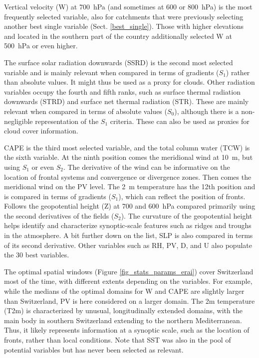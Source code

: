\documentclass[draft]{agujournal2019}
\begin{document}
Vertical velocity (W) at 700~hPa (and sometimes at 600 or 800~hPa) is the most frequently selected variable, also for catchments that were previously selecting another best single variable (Sect. \ref{best_single}). Those with higher elevations and located in the southern part of the country additionally selected W at 500~hPa or even higher.

The surface solar radiation downwards (SSRD) is the second most selected variable and is mainly relevant when compared in terms of gradients ($S_{1}$) rather than absolute values. It might thus be used as a proxy for clouds. Other radiation variables occupy the fourth and fifth ranks, such as surface thermal radiation downwards (STRD) and surface net thermal radiation (STR). These are mainly relevant when compared in terms of absolute values ($S_{0}$), although there is a non-negligible representation of the $S_{1}$ criteria. These can also be used as proxies for cloud cover information.

CAPE is the third most selected variable, and the total column water (TCW) is the sixth variable. At the ninth position comes the meridional wind at 10~m, but using $S_{1}$ or even $S_{2}$. The derivative of the wind can be informative on the location of frontal systems and convergence or divergence zones. Then comes the meridional wind on the PV level. The 2~m temperature has the 12th position and is compared in terms of gradients ($S_{1}$), which can reflect the position of fronts. Follows the geopotential height (Z) at 700 and 600~hPa compared primarily using the second derivatives of the fields ($S_{2}$). The curvature of the geopotential height helps identify and characterize synoptic-scale features such as ridges and troughs in the atmosphere. A bit further down on the list, SLP is also compared in terms of its second derivative. Other variables such as RH, PV, D, and U also populate the 30 best variables.

The optimal spatial windows (Figure \ref{fig_stats_params_erai}) cover Switzerland most of the time, with different extents depending on the variables. For example, while the medians of the optimal domains for W and CAPE are slightly larger than Switzerland, PV is here considered on a larger domain. The 2m temperature (T2m) is characterized by unusual, longitudinally extended domains, with the main body in southern Switzerland extending to the northern Mediterranean. Thus, it likely represents information at a synoptic scale, such as the location of fronts, rather than local conditions. Note that SST was also in the pool of potential variables but has never been selected as relevant.
\end{document}
